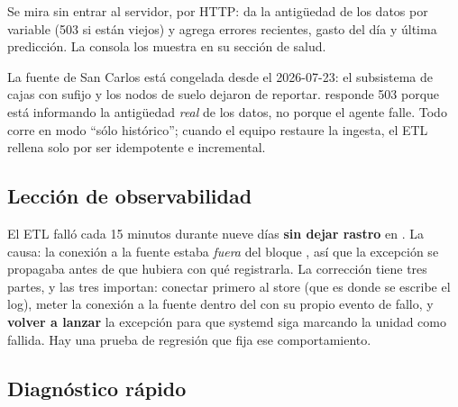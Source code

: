 Se mira sin entrar al servidor, por HTTP:  da la antigüedad de los
datos por variable (503 si están viejos) y  agrega errores recientes,
gasto del día y última predicción. La consola los muestra en su sección de salud.

\begin{aviso}[title=El 503 actual es correcto]
La fuente de San Carlos está congelada desde el 2026-07-23: el subsistema de cajas con
sufijo  y los nodos de suelo dejaron de reportar.  responde 503
porque está informando la antigüedad \emph{real} de los datos, no porque el agente falle.
Todo corre en modo ``sólo histórico''; cuando el equipo restaure la ingesta, el ETL
rellena solo por ser idempotente e incremental.
\end{aviso}

\subsection{Lección de observabilidad}

El ETL falló cada 15 minutos durante nueve días \textbf{sin dejar rastro} en
. La causa: la conexión a la fuente estaba \emph{fuera} del bloque
, así que la excepción se propagaba antes de que hubiera con qué registrarla.
La corrección tiene tres partes, y las tres importan: conectar primero al store (que es
donde se escribe el log), meter la conexión a la fuente dentro del  con su propio
evento de fallo, y \textbf{volver a lanzar} la excepción para que systemd siga marcando
la unidad como fallida. Hay una prueba de regresión que fija ese comportamiento.

\subsection{Diagnóstico rápido}

